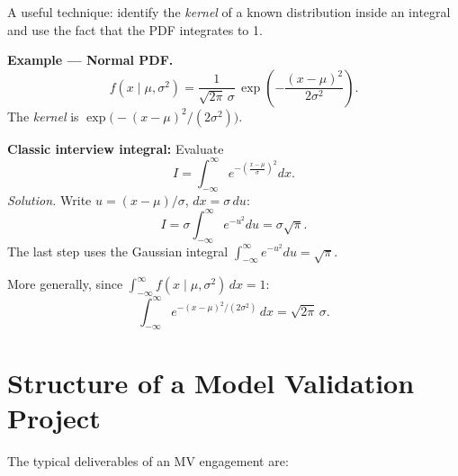 \documentclass[11pt, a4paper]{article}
\begin{document}
A useful technique: identify the \emph{kernel} of a known distribution inside an integral and use the fact that the PDF integrates to 1.

\textbf{Example --- Normal PDF.}
\[
  f(x \mid \mu, \sigma^2) = \frac{1}{\sqrt{2\pi}\,\sigma}\,\exp\!\left(-\frac{(x-\mu)^2}{2\sigma^2}\right).
\]
The \emph{kernel} is $\exp\!\bigl(-(x-\mu)^2 / (2\sigma^2)\bigr)$.

\textbf{Classic interview integral:} Evaluate
\[
  I = \int_{-\infty}^{\infty} e^{-\left(\frac{x-\mu}{\sigma}\right)^2} dx.
\]
\textit{Solution.} Write $u = (x-\mu)/\sigma$, $dx = \sigma\,du$:
\[
  I = \sigma \int_{-\infty}^{\infty} e^{-u^2} du = \sigma\sqrt{\pi}.
\]
The last step uses the Gaussian integral $\int_{-\infty}^{\infty} e^{-u^2}du = \sqrt{\pi}$.

More generally, since $\int_{-\infty}^{\infty} f(x\mid\mu,\sigma^2)\,dx = 1$:
\[
  \int_{-\infty}^{\infty} e^{-(x-\mu)^2/(2\sigma^2)}\,dx = \sqrt{2\pi}\,\sigma.
\]

\section{Structure of a Model Validation Project}

The typical deliverables of an MV engagement are:
\end{document}
